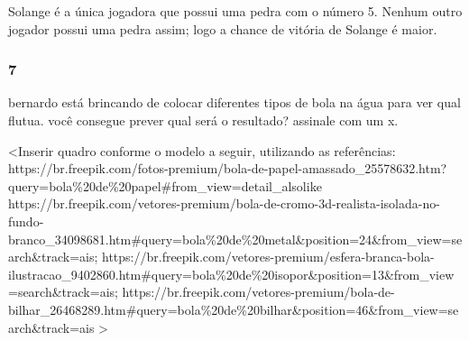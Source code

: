 Solange é a única
jogadora que possui uma pedra com o número 5. Nenhum outro jogador
possui uma pedra assim; logo a chance de vitória de Solange é maior.

\subsubsection{7}\label{section-69}

bernardo está brincando de colocar diferentes tipos de bola na água
para ver qual flutua. você consegue prever qual será o resultado? assinale
com um x.

\textless{}Inserir quadro conforme o modelo a seguir, utilizando as
referências:
https://br.freepik.com/fotos-premium/bola-de-papel-amassado\_25578632.htm?query=bola\%20de\%20papel\#from\_view=detail\_alsolike
https://br.freepik.com/vetores-premium/bola-de-cromo-3d-realista-isolada-no-fundo-branco\_34098681.htm\#query=bola\%20de\%20metal\&position=24\&from\_view=search\&track=ais;
https://br.freepik.com/vetores-premium/esfera-branca-bola-ilustracao\_9402860.htm\#query=bola\%20de\%20isopor\&position=13\&from\_view=search\&track=ais;
https://br.freepik.com/vetores-premium/bola-de-bilhar\_26468289.htm\#query=bola\%20de\%20bilhar\&position=46\&from\_view=search\&track=ais
\textgreater{}

